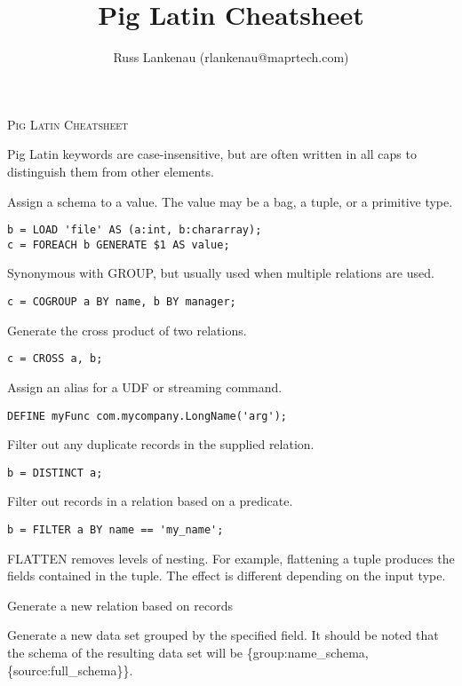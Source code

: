 \documentclass[10pt,letterpaper,twoside]{letter}
\author{Russ Lankenau (rlankenau@maprtech.com)}
\title{Pig Latin Cheatsheet}
\begin{document}
\begin{center}
\textsc{\large Pig Latin Cheatsheet}
\end{center}
Pig Latin keywords are case-insensitive, but are often written in all caps to distinguish them from other elements.
\begin{multicols}{2}
\let\thefootnote\relax{}
\begin{description} [style=nextline]
\item[AS] Assign a schema to a value.  The value may be a bag, a tuple, or a primitive type. 
\begin{verbatim}
b = LOAD 'file' AS (a:int, b:chararray);
c = FOREACH b GENERATE $1 AS value;
\end{verbatim}
\item[COGROUP$\dagger$] Synonymous with GROUP, but usually used when multiple relations are used. 
\begin{verbatim}
c = COGROUP a BY name, b BY manager;
\end{verbatim}
\item[CROSS$\dagger$] Generate the cross product of two relations. 
\begin{verbatim}
c = CROSS a, b;
\end{verbatim}
\item[DEFINE] Assign an alias for a UDF or streaming command.
\begin{verbatim}
DEFINE myFunc com.mycompany.LongName('arg');
\end{verbatim}
\item[DISTINCT$\dagger$] Filter out any duplicate records in the supplied relation.
\begin{verbatim}
b = DISTINCT a;
\end{verbatim}
\item[FILTER/BY] Filter out records in a relation based on a predicate.  \begin{verbatim}
b = FILTER a BY name == 'my_name';
\end{verbatim}
\item[FLATTEN] FLATTEN removes levels of nesting.  For example, flattening a tuple produces the fields contained in the tuple.  The effect is different depending on the input type.  
\item[FOREACH/GENERATE] Generate a new relation based on records 
\item[GROUP/BY$\dagger$] Generate a new data set grouped by the specified field.   It should be noted that the schema of the resulting data set will be \{group:name\_schema, \{source:full\_schema\}\}. \begin{verbatim}

\end{verbatim}
\end{description}
\end{multicols}
\end{document}
